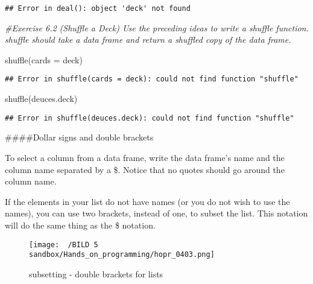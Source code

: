 \documentclass[
]{article}
\newenvironment{Shaded}{\begin{snugshade}}{\end{snugshade}}
\newcommand{\AttributeTok}[1]{\textcolor[rgb]{0.77,0.63,0.00}{#1}}
\newcommand{\CommentTok}[1]{\textcolor[rgb]{0.56,0.35,0.01}{\textit{#1}}}
\newcommand{\FunctionTok}[1]{\textcolor[rgb]{0.00,0.00,0.00}{#1}}
\newcommand{\NormalTok}[1]{#1}
\newcommand{\SpecialCharTok}[1]{\textcolor[rgb]{0.00,0.00,0.00}{#1}}
\begin{document}
\begin{verbatim}
## Error in deal(): object 'deck' not found
\end{verbatim}

\begin{Shaded}
\begin{Highlighting}[]
\CommentTok{\#Exercise 6.2 (Shuffle a Deck) Use the preceding ideas to write a shuffle function. shuffle should take a data frame and return a shuffled copy of the data frame.}

\FunctionTok{shuffle}\NormalTok{(}\AttributeTok{cards =}\NormalTok{ deck)}
\end{Highlighting}
\end{Shaded}

\begin{verbatim}
## Error in shuffle(cards = deck): could not find function "shuffle"
\end{verbatim}

\begin{Shaded}
\begin{Highlighting}[]
\FunctionTok{shuffle}\NormalTok{(deuces.deck)}
\end{Highlighting}
\end{Shaded}

\begin{verbatim}
## Error in shuffle(deuces.deck): could not find function "shuffle"
\end{verbatim}

\#\#\#\#Dollar signs and double brackets

To select a column from a data frame, write the data frame's name and
the column name separated by a \$. Notice that no quotes should go
around the column name.

If the elements in your list do not have names (or you do not wish to
use the names), you can use two brackets, instead of one, to subset the
list. This notation will do the same thing as the \$ notation.

\begin{figure}
\centering
\texttt{[image: ~/BILD 5 sandbox/Hands\_on\_programming/hopr\_0403.png]}
\caption{subsetting - double brackets for lists}
\end{figure}

\begin{Shaded}
\end{Shaded}
\end{document}

